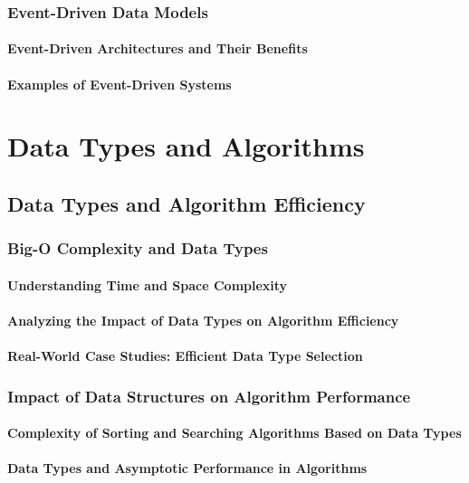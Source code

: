 \documentclass[12pt, oneside]{book}
\begin{document}
\subsection{Event-Driven Data Models}
\subsubsection{Event-Driven Architectures and Their Benefits}
\subsubsection{Examples of Event-Driven Systems}

\chapter{Data Types and Algorithms}
\section{Data Types and Algorithm Efficiency}
\subsection{Big-O Complexity and Data Types}
\subsubsection{Understanding Time and Space Complexity}
\subsubsection{Analyzing the Impact of Data Types on Algorithm Efficiency}
\subsubsection{Real-World Case Studies: Efficient Data Type Selection}
\subsection{Impact of Data Structures on Algorithm Performance}
\subsubsection{Complexity of Sorting and Searching Algorithms Based on Data Types}
\subsubsection{Data Types and Asymptotic Performance in Algorithms}
\end{document}
